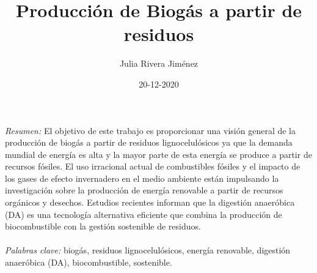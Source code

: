 \documentclass[a4paper,11pt]{article}
\begin{document}
\title{Producción de Biogás a partir de residuos}
\author{Julia Rivera Jiménez}
\date{20-12-2020}
\maketitle

{\em Resumen:} 
El objetivo de este trabajo es proporcionar una visión general de la producción de biogás a partir de residuos lignocelulósicos ya que la demanda mundial de energía es alta y la mayor parte de esta energía se produce a partir de recursos fósiles. El uso irracional actual de combustibles fósiles y el impacto de los gases de efecto invernadero en el medio ambiente están impulsando la investigación sobre la producción de energía renovable a partir de recursos orgánicos y desechos. Estudios recientes informan que la digestión anaeróbica (DA) es una tecnología alternativa eficiente que combina la producción de biocombustible con la gestión sostenible de residuos.
\\\\
{\em Palabras clave:}
biogás, residuos lignocelulósicos, energía renovable, digestión anaeróbica (DA), biocombustible, sostenible.
\end{document}
